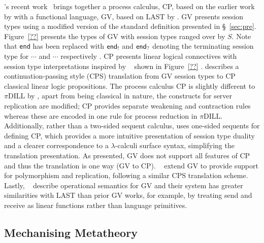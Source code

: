 \citeauthor{Wadler:2014}'s recent work~\cite{Wadler:2014} brings together a
process calculus, CP, based on the earlier work by
\citeauthor{Caires:2010:STI} with a functional language, GV, based on LAST by
\citeauthor{Gay:2010:LAST}. GV presents session types using a modified version
of the standard definition presented in \S~\ref{sec:pre}. Figure~\ref{??}
presents the types of GV with session types ranged over by $S$. Note that
\lstinline{end} has been replaced with $\textsf{end}_{!}$ and $\textsf{end}_{?}$ denoting the
terminating session type for $\cdots$ and $\cdots$ respectively . CP presents linear logical connectives with session type
interpretations inspired by
\citeauthor{Caires:2010:STI}~\cite{Caires:2010:STI} shown in Figure~\ref{??}
. \citeauthor{Wadler:2014} describes a continuation-passing
style (CPS) translation from GV session types to CP classical linear logic
propositions.   The process
calculus CP is slightly different to $\pi$DILL by
\citeauthor{Caires:2010:STI}, apart from being classical in nature, the
constructs for server replication are modified; CP provides separate weakening
and contraction rules whereas these are encoded in one rule for process
reduction in $\pi$DILL. Additionally, rather than a two-sided sequent
calculus, \citeauthor{Wadler:2014} uses one-sided sequents for defining CP,
which provides a more intuitive presentation of session type duality and a
clearer correspondence to a $\lambda$-calculi surface syntax, simplifying the
translation presentation. As presented, GV does not support all features of CP
and thus the translation is one way (GV to
CP). \citeauthor{Lindley:2014:SAP}~\cite{Lindley:2014:SAP} extend GV to
provide support for polymorphism and replication, following a similar CPS
translation scheme. Lastly,
\citeauthor{Lindley:2014:SPS}~\cite{Lindley:2014:SPS} describe operational
semantics for GV and their system has greater similarities with LAST than
prior GV works, for example, by treating send and receive as linear functions
rather than language primitives.

\subsection{Mechanising Metatheory}

